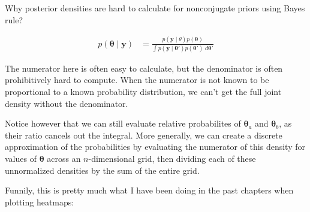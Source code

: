 \documentclass[]{article}
\begin{document}
Why posterior densities are hard to calculate for nonconjugate priors
using Bayes rule?

\begin{align}
p(\boldsymbol{\theta} \mid \mathbf{y}) &= \frac{p(\mathbf{y} \mid
\theta) p(\boldsymbol{\theta})}{\int p(\mathbf{y} \mid
\boldsymbol{\theta}') p(\boldsymbol{\theta}') \; d\boldsymbol{\theta}'}
\end{align}

The numerator here is often easy to calculate, but the denominator is
often prohibitively hard to compute. When the numerator is not known to
be proportional to a known probability distribution, we can't get the
full joint density without the denominator.

Notice however that we can still evaluate relative probabilites of
\(\boldsymbol{\theta}_a\) and \(\boldsymbol{\theta}_b\), as their ratio
cancels out the integral. More generally, we can create a discrete
approximation of the probabilities by evaluating the numerator of this
density for values of \(\boldsymbol{\theta}\) across an
\(n\)-dimensional grid, then dividing each of these unnormalized
densities by the sum of the entire grid.

Funnily, this is pretty much what I have been doing in the past chapters
when plotting heatmaps:
\end{document}
